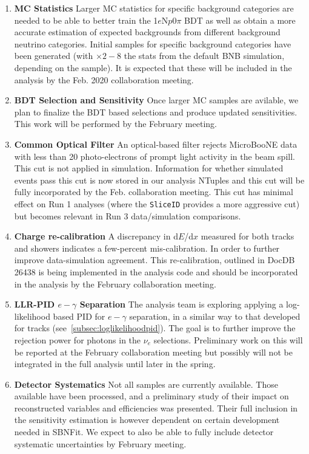 \documentclass[a4paper]{article}
\newcommand{\npsel}{1$e$N$p$0$\pi$ }
\begin{document}
\begin{enumerate}
    \item \textbf{MC Statistics} Larger MC statistics for specific background categories are needed to be able to better train the \npsel BDT as well as obtain a more accurate estimation of expected backgrounds from different background neutrino categories. Initial samples for specific background categories have been generated (with $\times2-8$ the stats from the default BNB simulation, depending on the sample). It is expected that these will be included in the analysis by the Feb. 2020 collaboration meeting. %
    \item \textbf{BDT Selection and Sensitivity} Once larger MC samples are avilable, we plan to finalize the BDT based selections and produce updated sensitivities. This work will be performed by the February meeting. %
    \item \textbf{Common Optical Filter} An optical-based filter rejects MicroBooNE data with less than 20 photo-electrons of prompt light activity in the beam spill. This cut is not applied in simulation. Information for whether simulated events pass this cut is now stored in our analysis NTuples and this cut will be fully incorporated by the Feb. collaboration meeting. This cut has minimal effect on Run 1 analyses (where the \texttt{SliceID} provides a more aggressive cut) but becomes relevant in Run 3 data/simulation comparisons. %
    \item \textbf{Charge re-calibration} A discrepancy in d$E$/d$x$ measured for both tracks and showers indicates a few-percent mis-calibration. In order to further improve data-simulation agreement. This re-calibration, outlined in DocDB 26438 is being implemented in the analysis code and should be incorporated in the analysis by the February collaboration meeting. %
    \item \textbf{LLR-PID $e-\gamma$ Separation} The analysis team is exploring applying a log-likelihood based PID for $e-\gamma$ separation, in a similar way to that developed for tracks (see~\ref{subsec:loglikelihoodpid}). The goal is to further improve the rejection power for photons in the $\nu_e$ selections. Preliminary work on this will be reported at the February collaboration meeting but possibly will not be integrated in the full analysis until later in the spring.%
    \item \textbf{Detector Systematics} Not all samples are currently available. Those available have been processed, and a preliminary study of their impact on reconstructed variables and efficiencies was presented. Their full inclusion in the sensitivity estimation is however dependent on certain development needed in SBNFit. We expect to also be able to fully include detector systematic uncertainties by February meeting.%

\end{enumerate}
\end{document}
